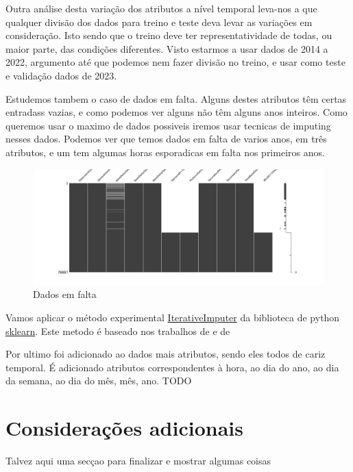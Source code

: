 Outra análise desta variação dos atributos a nível temporal leva-nos a que qualquer divisão dos dados para treino e teste deva levar as variações em consideração. Isto sendo que o treino deve ter representatividade de todas, ou maior parte, das condições diferentes.
Visto estarmos a usar dados de 2014 a 2022, argumento até que podemos nem fazer divisão no treino, e usar como teste e validação dados de 2023.


Estudemos tambem o caso de dados em falta. Alguns destes atributos têm certas entradass vazias, e como podemos ver alguns não têm alguns anos inteiros.
Como queremos usar o maximo de dados possiveis iremos usar tecnicas de imputing nesses dados.
Podemos ver que temos dados em falta de varios anos, em três atributos, e um tem algumas horas esporadicas em falta nos primeiros anos.

\begin{figure}[H]
  \centering
  \includegraphics[width=\textwidth]{../plots/missing_data.png}
  \caption{Dados em falta}
\end{figure}

Vamos aplicar o método experimental \href{https://scikit-learn.org/stable/modules/generated/sklearn.impute.IterativeImputer.html}{IterativeImputer} da biblioteca de python \href{https://scikit-learn.org/stable/index.html}{sklearn}.
Este metodo é baseado nos trabalhos de \cite{vanBuuren2011} e de \cite{Buck1960}


Por ultimo foi adicionado ao dados mais atributos, sendo eles todos de cariz temporal. É adicionado atributos correspondentes à hora, ao dia do ano, ao dia da semana, ao dia do mês, mês, ano. TODO


\section{Considerações adicionais\label{se:dados_plus}}

Talvez aqui uma secçao para finalizar e mostrar algumas coisas
